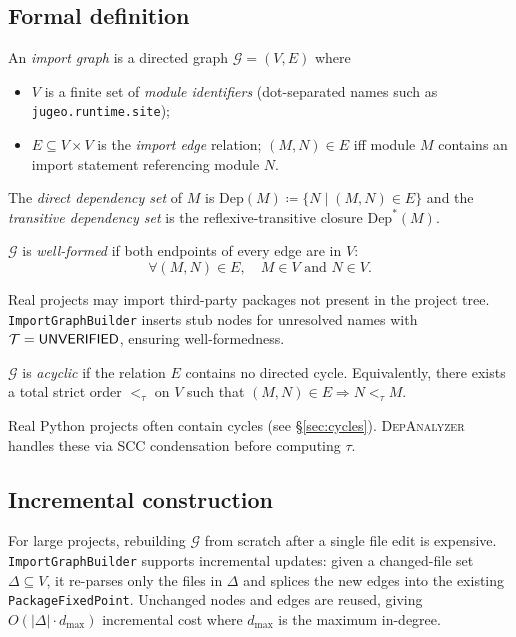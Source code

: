 \documentclass[11pt]{article}
\newcommand{\IG}{\mathcal{G}}              %
\newcommand{\DA}{\textsc{DepAnalyzer}}     %
\newcommand{\Dep}{\mathrm{Dep}}            %
\newcommand{\TopoOrd}{\tau}                %
\begin{document}
\subsection{Formal definition}

\begin{definition}
\label{def:import-graph}
An \emph{import graph} is a directed graph $\IG = (V, E)$ where
\begin{itemize}
  \item $V$ is a finite set of \emph{module identifiers}
        (dot-separated names such as \texttt{jugeo.runtime.site});
  \item $E \subseteq V \times V$ is the \emph{import edge} relation;
        $(M, N) \in E$ iff module $M$ contains an import statement
        referencing module $N$.
\end{itemize}
The \emph{direct dependency set} of $M$ is
$\Dep(M) \coloneqq \{N \mid (M, N) \in E\}$
and the \emph{transitive dependency set} is the reflexive-transitive
closure $\Dep^*(M)$.
\end{definition}

\begin{definition}
\label{def:well-formed}
$\IG$ is \emph{well-formed} if both endpoints of every edge are in $V$:
\[
  \forall (M, N) \in E,\quad M \in V \text{ and } N \in V.
\]
\end{definition}

Real projects may import third-party packages not present in the
project tree.  \texttt{ImportGraphBuilder} inserts stub nodes for
unresolved names with $\mathcal{T} = \mathsf{UNVERIFIED}$, ensuring well-formedness.

\begin{definition}
\label{def:acyclic}
$\IG$ is \emph{acyclic} if the relation $E$ contains no directed cycle.
Equivalently, there exists a total strict order $<_{\TopoOrd}$ on $V$
such that $(M, N) \in E \Rightarrow N <_{\TopoOrd} M$.
\end{definition}

Real Python projects often contain cycles (see \S\ref{sec:cycles}).
\DA{} handles these via SCC condensation before computing $\TopoOrd$.

\subsection{Incremental construction}

For large projects, rebuilding $\IG$ from scratch after a single file
edit is expensive.  \texttt{ImportGraphBuilder} supports incremental
updates: given a changed-file set $\Delta \subseteq V$, it re-parses
only the files in $\Delta$ and splices the new edges into the existing
\texttt{PackageFixedPoint}.  Unchanged nodes and edges are reused,
giving $O(|\Delta| \cdot d_{\max})$ incremental cost where $d_{\max}$
is the maximum in-degree.
\end{document}
